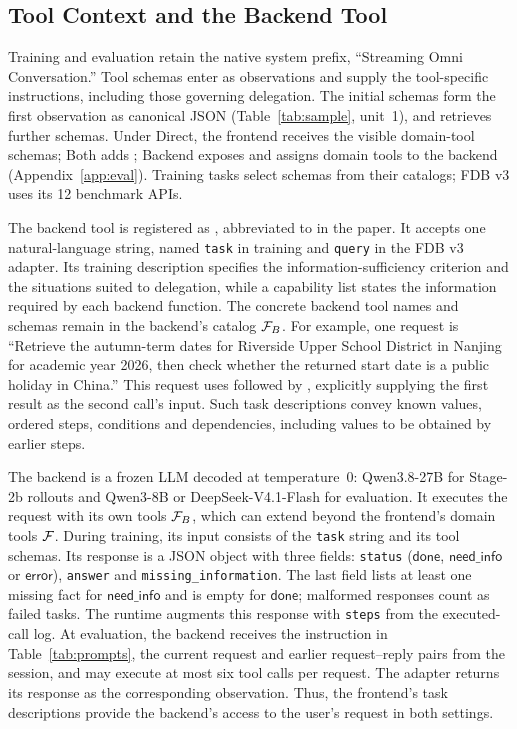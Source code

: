 \subsection{Tool Context and the Backend Tool}
Training and evaluation retain the native system prefix, ``Streaming Omni Conversation.''
Tool schemas enter as observations and supply the tool-specific instructions, including those governing delegation.
The initial schemas form the first observation as canonical JSON (Table~\ref{tab:sample}, unit~1), and  retrieves further schemas.
Under Direct, the frontend receives the visible domain-tool schemas; Both adds ; Backend exposes  and assigns domain tools to the backend (Appendix~\ref{app:eval}).
Training tasks select schemas from their catalogs; FDB v3 uses its 12 benchmark APIs.

The backend tool is registered as , abbreviated to  in the paper.
It accepts one natural-language string, named \texttt{task} in training and \texttt{query} in the FDB v3 adapter.
Its training description specifies the information-sufficiency criterion and the situations suited to delegation, while a capability list states the information required by each backend function.
The concrete backend tool names and schemas remain in the backend's catalog $\mathcal{F}_{B}$.
For example, one request is ``Retrieve the autumn-term dates for Riverside Upper School District in Nanjing for academic year 2026, then check whether the returned start date is a public holiday in China.''
This request uses  followed by , explicitly supplying the first result as the second call's input.
Such task descriptions convey known values, ordered steps, conditions and dependencies, including values to be obtained by earlier steps.

The backend is a frozen LLM decoded at temperature~0: Qwen3.8-27B for Stage-2b rollouts and Qwen3-8B or DeepSeek-V4.1-Flash for evaluation.
It executes the request with its own tools $\mathcal{F}_{B}$, which can extend beyond the frontend's domain tools $\mathcal{F}$.
During training, its input consists of the \texttt{task} string and its tool schemas.
Its response is a JSON object with three fields: \texttt{status} ($\textsf{done}$, $\textsf{need\_info}$ or $\textsf{error}$), \texttt{answer} and \texttt{missing\_information}.
The last field lists at least one missing fact for $\textsf{need\_info}$ and is empty for $\textsf{done}$; malformed responses count as failed tasks.
The runtime augments this response with \texttt{steps} from the executed-call log.
At evaluation, the backend receives the instruction in Table~\ref{tab:prompts}, the current request and earlier request--reply pairs from the session, and may execute at most six tool calls per request.
The adapter returns its response as the corresponding observation.
Thus, the frontend's task descriptions provide the backend's access to the user's request in both settings.

